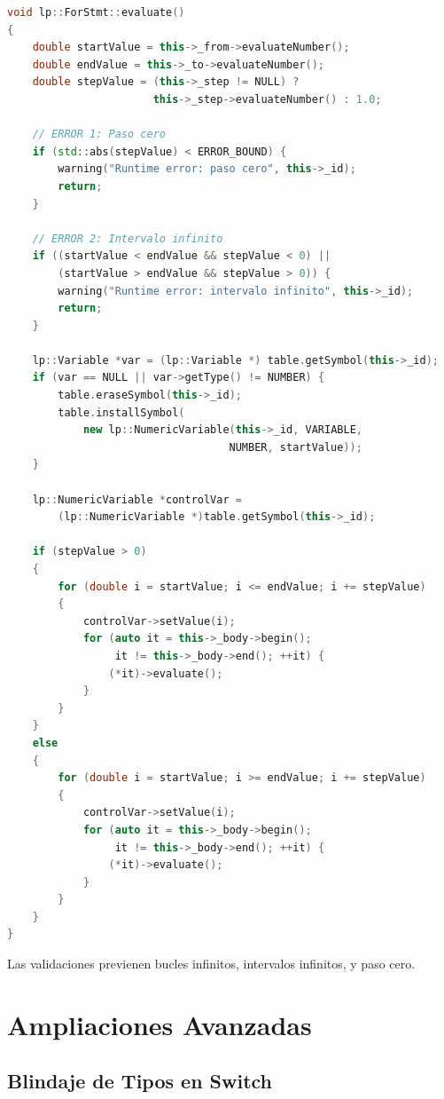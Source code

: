 \documentclass[11pt,a4paper]{article}
\begin{document}
\begin{lstlisting}[language=C++, caption={ForStmt - Control exhaustivo}]
void lp::ForStmt::evaluate() 
{
    double startValue = this->_from->evaluateNumber();
    double endValue = this->_to->evaluateNumber();
    double stepValue = (this->_step != NULL) ? 
                       this->_step->evaluateNumber() : 1.0;

    // ERROR 1: Paso cero
    if (std::abs(stepValue) < ERROR_BOUND) {
        warning("Runtime error: paso cero", this->_id);
        return;
    }
    
    // ERROR 2: Intervalo infinito
    if ((startValue < endValue && stepValue < 0) || 
        (startValue > endValue && stepValue > 0)) {
        warning("Runtime error: intervalo infinito", this->_id);
        return;
    }

    lp::Variable *var = (lp::Variable *) table.getSymbol(this->_id);
    if (var == NULL || var->getType() != NUMBER) {
        table.eraseSymbol(this->_id); 
        table.installSymbol(
            new lp::NumericVariable(this->_id, VARIABLE, 
                                   NUMBER, startValue));
    }

    lp::NumericVariable *controlVar = 
        (lp::NumericVariable *)table.getSymbol(this->_id);
    
    if (stepValue > 0) 
    {
        for (double i = startValue; i <= endValue; i += stepValue) 
        {
            controlVar->setValue(i); 
            for (auto it = this->_body->begin(); 
                 it != this->_body->end(); ++it) {
                (*it)->evaluate();
            }
        }
    } 
    else 
    {
        for (double i = startValue; i >= endValue; i += stepValue) 
        {
            controlVar->setValue(i); 
            for (auto it = this->_body->begin(); 
                 it != this->_body->end(); ++it) {
                (*it)->evaluate();
            }
        }
    }
}
\end{lstlisting}

Las validaciones previenen bucles infinitos, intervalos infinitos, y paso cero.

\newpage

\section{Ampliaciones Avanzadas}

\subsection{Blindaje de Tipos en Switch}
\end{document}
